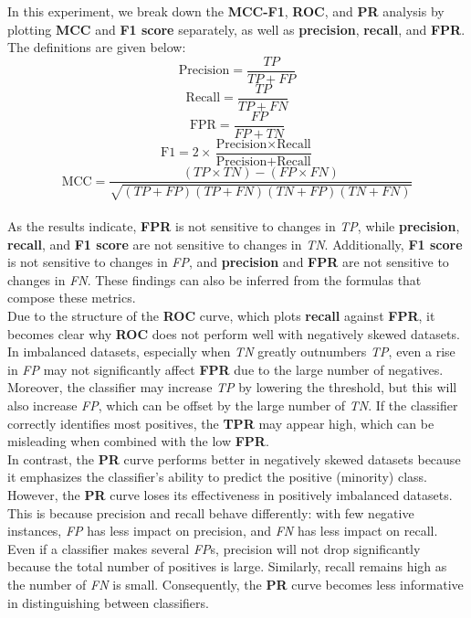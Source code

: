 \documentclass[12pt, oneside]{amsart}
\theoremstyle{definition}
\theoremstyle{remark}
\numberwithin{equation}{section}
\begin{document}
In this experiment, we break down the \textbf{MCC-F1}, \textbf{ROC}, and \textbf{PR} analysis by plotting \textbf{MCC} and \textbf{F1 score} separately, as well as \textbf{precision}, \textbf{recall}, and \textbf{FPR}. The definitions are given below: 
\[
\text{Precision} = \frac{TP}{TP + FP}
\]
\[
\text{Recall} = \frac{TP}{TP + FN}
\]
\[
\text{FPR} = \frac{FP}{FP + TN}
\]
\[
\text{F1} = 2 \times \frac{\text{Precision} \times \text{Recall}}{\text{Precision} + \text{Recall}}
\]
\[
\text{MCC} = \frac{(TP \times TN) - (FP \times FN)}{\sqrt{(TP + FP)(TP + FN)(TN + FP)(TN + FN)}}
\]
\\
As the results indicate, \textbf{FPR} is not sensitive to changes in \textit{TP}, while \textbf{precision}, \textbf{recall}, and \textbf{F1 score} are not sensitive to changes in \textit{TN}. Additionally, \textbf{F1 score} is not sensitive to changes in \textit{FP}, and \textbf{precision} and \textbf{FPR} are not sensitive to changes in \textit{FN}. These findings can also be inferred from the formulas that compose these metrics.\\

Due to the structure of the \textbf{ROC} curve, which plots \textbf{recall} against \textbf{FPR}, it becomes clear why \textbf{ROC} does not perform well with negatively skewed datasets. In imbalanced datasets, especially when \textit{TN} greatly outnumbers \textit{TP}, even a rise in \textit{FP} may not significantly affect \textbf{FPR} due to the large number of negatives. Moreover, the classifier may increase \textit{TP} by lowering the threshold, but this will also increase \textit{FP}, which can be offset by the large number of \textit{TN}. If the classifier correctly identifies most positives, the \textbf{TPR} may appear high, which can be misleading when combined with the low \textbf{FPR}. \\

In contrast, the \textbf{PR} curve performs better in negatively skewed datasets because it emphasizes the classifier's ability to predict the positive (minority) class. However, the \textbf{PR} curve loses its effectiveness in positively imbalanced datasets. This is because precision and recall behave differently: with few negative instances, \textit{FP} has less impact on precision, and \textit{FN} has less impact on recall. Even if a classifier makes several \textit{FP}s, precision will not drop significantly because the total number of positives is large. Similarly, recall remains high as the number of \textit{FN} is small. Consequently, the \textbf{PR} curve becomes less informative in distinguishing between classifiers. \\
\end{document}
